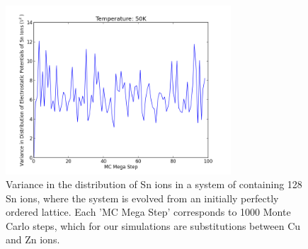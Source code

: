 \begin{figure}[h!]
  \centering
    \includegraphics[width=0.75\textwidth]{figures/1000Minor_per_Mega2.png}
    \caption{Variance in the distribution of Sn ions in a system of containing 128 Sn ions, where the system is evolved from an initially perfectly ordered lattice. Each 'MC Mega Step' corresponds to 1000 Monte Carlo steps, which for our simulations are substitutions between Cu and Zn ions.}
  \label{variance_with_MCS_1000}
\end{figure}


